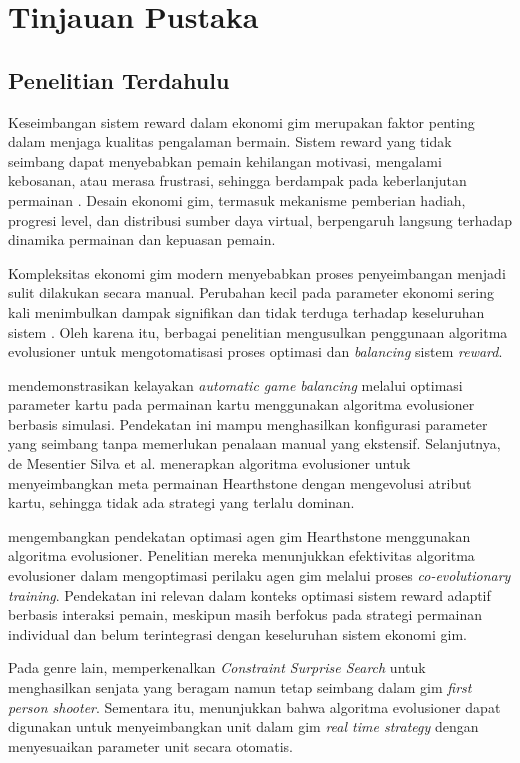 \chapter{Tinjauan Pustaka}\label{ch:literature}

\section{Penelitian Terdahulu}\label{sec:past research}

Keseimbangan sistem reward dalam ekonomi gim merupakan faktor penting dalam menjaga kualitas pengalaman bermain. Sistem reward yang tidak seimbang dapat menyebabkan pemain kehilangan motivasi, mengalami kebosanan, atau merasa frustrasi, sehingga berdampak pada keberlanjutan permainan \citep{Holmberg2021}. Desain ekonomi gim, termasuk mekanisme pemberian hadiah, progresi level, dan distribusi sumber daya virtual, berpengaruh langsung terhadap dinamika permainan dan kepuasan pemain.

Kompleksitas ekonomi gim modern menyebabkan proses penyeimbangan menjadi sulit dilakukan secara manual. Perubahan kecil pada parameter ekonomi sering kali menimbulkan dampak signifikan dan tidak terduga terhadap keseluruhan sistem \citep{Volz2016}. Oleh karena itu, berbagai penelitian mengusulkan penggunaan algoritma evolusioner untuk mengotomatisasi proses optimasi dan \textit{balancing} sistem \textit{reward}.

\cite{Volz2016} mendemonstrasikan kelayakan \textit{automatic game balancing} melalui optimasi parameter kartu pada permainan kartu menggunakan algoritma evolusioner berbasis simulasi. Pendekatan ini mampu menghasilkan konfigurasi parameter yang seimbang tanpa memerlukan penalaan manual yang ekstensif. Selanjutnya, de Mesentier Silva et al. \cite{deMesentierSilva2019} menerapkan algoritma evolusioner untuk menyeimbangkan meta permainan Hearthstone dengan mengevolusi atribut kartu, sehingga tidak ada strategi yang terlalu dominan.

\cite{garcia2020optimizing} mengembangkan pendekatan optimasi agen gim Hearthstone menggunakan algoritma evolusioner. Penelitian mereka menunjukkan efektivitas algoritma evolusioner dalam mengoptimasi perilaku agen gim melalui proses \textit{co-evolutionary training}. Pendekatan ini relevan dalam konteks optimasi sistem reward adaptif berbasis interaksi pemain, meskipun masih berfokus pada strategi permainan individual dan belum terintegrasi dengan keseluruhan sistem ekonomi gim.

Pada genre lain, \cite{Gravina2016} memperkenalkan \textit{Constraint Surprise Search} untuk menghasilkan senjata yang beragam namun tetap seimbang dalam gim \textit{first person shooter}. Sementara itu, \cite{Morosan2017} menunjukkan bahwa algoritma evolusioner dapat digunakan untuk menyeimbangkan unit dalam gim \textit{real time strategy} dengan menyesuaikan parameter unit secara otomatis.

